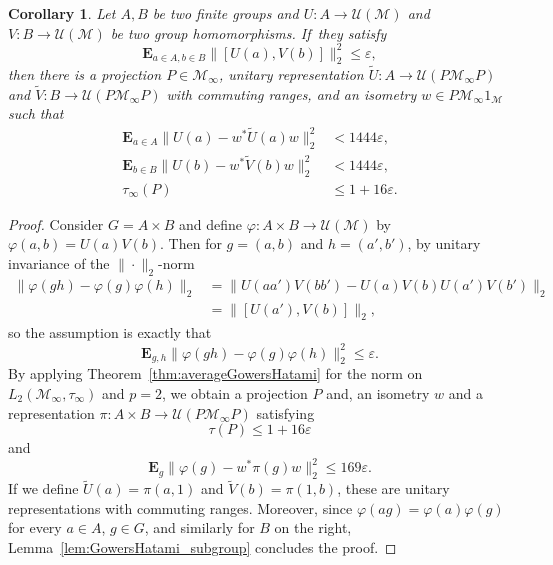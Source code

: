 \documentclass[10pt]{amsart}
\theoremstyle{plain}
\newtheorem{corollary}[theorem]{Corollary}
\theoremstyle{definition}
\newcommand{\cM}{\mathcal{M}}
\newcommand{\E}{\mathbf{E}}
\newcommand{\cU}{\mathcal{U}}
\begin{document}
\begin{corollary}\label{cor:averageGowersHatami_products} Let $A,B$ be two finite groups and $U:A \to \cU(\cM)$ and $V: B \to \cU(\cM)$ be two group homomorphisms. If~they satisfy
\[
\E_{a \in A,b \in B} \|[U(a),V(b)]\|_2^2 \leq \varepsilon,
\]
then there is a projection $P \in \cM_\infty$, unitary representation $\tilde{U}: A \to \cU(P\cM_\infty P)$ and $\tilde{V}: B \to \cU(P\cM_\infty P)$ with commuting ranges, and an isometry $w \in P \cM_\infty 1_\cM$ such that
\begin{align*}
\E_{a \in A} \|U(a)-w^* \tilde U(a) w\|_2^2&<1444\varepsilon,
\\
\E_{b \in B} \|U(b)-w^* \tilde V(b) w\|_2^2&<1444\varepsilon,
\\
\tau_\infty(P)&\leq 1+16\varepsilon.
\end{align*}
\end{corollary}
\begin{proof} Consider $G=A \times B$ and define $\varphi:A \times B \to \cU(\cM)$ by $\varphi(a,b) = U(a) V(b)$. Then for $g=(a,b)$ and $h=(a',b')$, by unitary invariance of the $\|{\cdot}\|_2$-norm
\begin{align*} \|\varphi(gh) - \varphi(g) \varphi(h)\|_2 &= \| U(aa') V(bb') - U(a) V(b) U(a') V(b')\|_2\\ &= \|[U(a'),V(b)]\|_2,
\end{align*}
so the assumption is exactly that
\[
\E_{g,h} \|\varphi(gh) - \varphi(g) \varphi(h)\|_2^2 \leq \varepsilon.
\]
By applying Theorem~\ref{thm:averageGowersHatami} for the norm on $L_2(\cM_\infty,\tau_\infty)$ and $p=2$, we obtain a projection $P$ and, an isometry $w$ and a representation $\pi:A \times B \to \cU(P\cM_\infty P)$ satisfying
\[
\tau(P) \leq 1+16 \varepsilon
\]
and
\begin{equation}\label{eq:phi_close_to_rho} \E_g \|\varphi(g) - w^* \pi(g) w\|_2^2 \leq 169 \varepsilon.\end{equation}
If we define $\tilde{U}(a) = \pi(a,1)$ and $\tilde{V}(b) = \pi(1,b)$, these are unitary representations with commuting ranges. Moreover, since $\varphi(a g) =\varphi(a) \varphi(g)$ for every $a \in A$, $g \in G$, and similarly for $B$ on the right, Lemma~\ref{lem:GowersHatami_subgroup} concludes the proof.
\end{proof}
\end{document}
